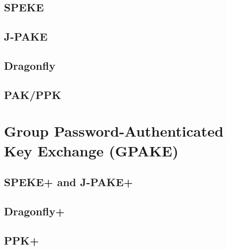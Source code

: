 \documentclass{amsart}
\theoremstyle{remark}
\begin{document}
\subsection{SPEKE}
\label{sec:SPEKE}

\vspace{0.3in}

\subsection{J-PAKE} 
\label{sec:JPAKE}

\vspace{0.3in}

\subsection{Dragonfly}
\label{sec:Dragon}

\vspace{0.3in}

\subsection{PAK/PPK}
\label{sec:PPK}

\vspace{0.3in}


\section{Group Password-Authenticated Key Exchange (GPAKE)} 
\label{sec:GPAKE}

\vspace{0.3in}

\subsection{SPEKE+ and J-PAKE+}

\vspace{0.3in}

\subsection{Dragonfly+}

\vspace{0.3in}

\subsection{PPK+}

\vspace{0.3in}
\end{document}
